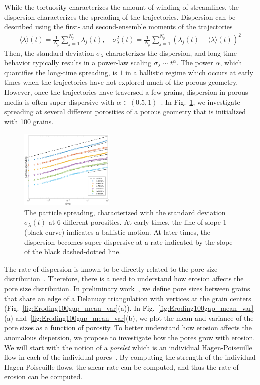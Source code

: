 \documentclass[11pt]{article}
\begin{document}
While the tortuosity characterizes the amount of winding of streamlines, the dispersion characterizes the spreading of the trajectories.  Dispersion can be described using the first- and second-ensemble moments of the trajectories
\begin{align}
  \langle \lambda \rangle (t) = \frac{1}{N_p} \sum_{j=1}^{N_p}
    \lambda_j(t), \quad \sigma_\lambda^{2}(t) = \frac{1}{N_p}
    \sum_{j=1}^{N_p} (\lambda_j(t) - \langle \lambda \rangle(t))^2
\end{align}
Then, the standard deviation $\sigma_\lambda$ characterizes the
dispersion, and long-time behavior typically results in a power-law
scaling $\sigma_\lambda \sim t^{\alpha}$. The power $\alpha$, which
quantifies the long-time spreading, is $1$ in a ballistic regime which
occurs at early times when the trajectories have not explored much of
the porous geometry. However, once the trajectories have traversed a few
grains, dispersion in porous media is often super-dispersive with
$\alpha \in (0.5,1)$~\cite{dea-leb-den-tar-bol-dav2013}. In Fig.~\ref{fig:100dispersion}, we investigate spreading at several different porosities of a porous geometry that is initialized with 100 grains.
\begin{figure}
  \includegraphics[width=0.4\textwidth]{figs/100b_second_moment_long_ref}
  \caption{\label{fig:100dispersion} The particle spreading,
  characterized with the standard deviation $\sigma_\lambda(t)$ at 6
  different porosities. At early times, the line of slope 1 (black
  curve) indicates a ballistic motion. At later times, the
  dispersion becomes super-dispersive at a rate indicated by the slope
  of the black dashed-dotted line.}
\end{figure}

The rate of dispersion is known to be directly related to the pore size
distribution~\cite{dea-qua-bir-jua2018}. Therefore, there is a need to
understand how erosion affects the pore size distribution. In
preliminary work~\cite{chi-moo-qua2019}, we define pore sizes between
grains that share an edge of a Delanuay triangulation with vertices at
the grain centers (Fig.~\ref{fig:Eroding100gap_mean_var}(a)). In Fig.~\ref{fig:Eroding100gap_mean_var}(a) and~\ref{fig:Eroding100gap_mean_var}(b), we plot the mean and variance of the pore sizes as a function of porosity. To better understand how erosion affects the anomalous dispersion, we propose to investigate how the pores grow with erosion. We will start with the notion of a {\em porelet} which is an individual Hagen-Poiseuille flow in each of the individual pores~\cite{dea-qua-bir-jua2018}. By computing the strength of the individual Hagen-Poiseuille flows, the shear rate can be computed, and thus the rate of erosion can be computed. 
\end{document}
